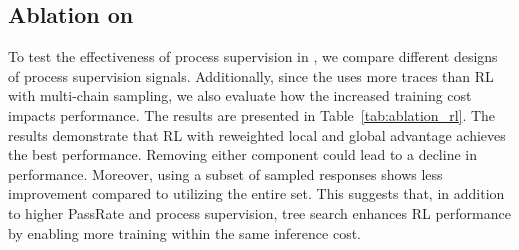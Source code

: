 \begin{table}[ht]
    \caption{Ablation on the effectiveness of different process signals for RL training using Qwen2.5-14B. $G_A$ and $L_A$ denote the global and local advantages, respectively. $n$ refers to the number of leaf nodes that can be reached from the given step. \textit{\#Response} denotes the number of responses used for training.}
    \centering
    \label{tab:ablation_rl}
\end{table}


\subsection{Ablation on \model}
To test the effectiveness of process supervision in \model, we compare different designs of process supervision signals. Additionally, since the \model uses more traces than RL with multi-chain sampling, we also evaluate how the increased training cost impacts performance. The results are presented in Table~\ref{tab:ablation_rl}.
The results demonstrate that RL with reweighted local and global advantage achieves the best performance. Removing either component could lead to a decline in performance. Moreover, using a subset of sampled responses shows less improvement compared to utilizing the entire set. This suggests that, in addition to higher PassRate and process supervision, tree search enhances RL performance by enabling more training within the same inference cost.


